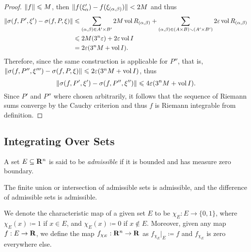 \begin{proof}
    \(\lVert f\rVert \leqslant M\), then \(\lVert f(\xi'_{\alpha}) - f(\xi_{(\alpha, \beta)})\rVert <
    2 M\) and thus
    \begin{align*}
        \lVert\sigma(f, P', \xi') - \sigma(f, P, \xi)\rVert
         & \leqslant  \sum_{(\alpha, \beta) \in A' \times B'} 2 M \operatorname{vol} R_{(\alpha, \beta)}
        + \sum_{(\alpha, \beta) \in (A \times B) \smallsetminus (A' \times B')}
        2 \varepsilon \operatorname{vol} R_{(\alpha, \beta)}                                        \\
         & \leqslant 2 M (3^n \varepsilon) + 2 \varepsilon \operatorname{vol} I                          \\
         & = 2 \varepsilon(3^n M + \operatorname{vol} I).
    \end{align*}
    Therefore, since the same construction is applicable for \(P''\), that is,
    \(\lVert\sigma(f, P'', \xi''') - \sigma(f, P, \xi)\rVert \leqslant 2 \varepsilon (3^n M +
    \operatorname{vol} I)\), thus
    \[
        \lVert\sigma(f, P', \xi') - \sigma(f, P'', \xi'')\rVert
        \leqslant 4 \varepsilon (3^n M + \operatorname{vol} I).
    \]
    Since \(P'\) and \(P''\) where chosen arbitrarily, it follows that the sequence
    of Riemann sums converge by the Cauchy criterion and thus \(f\) is Riemann
    integrable from definition.
\end{proof}

\subsection{Integrating Over Sets}

\begin{definition}
    \label{def:admissible-set}
    A set \(E \subseteq \mathbf{R}^n\) is said to be \emph{admissible} if it is bounded and
    has measure zero boundary.
\end{definition}

\begin{corollary}
    \label{cor:operations-admissible-sets}
    The finite union or intersection of admissible sets is admissible, and the
    difference of admissible sets is admissible.
\end{corollary}

\begin{notation}
    \label{not:characteristic-set}
    We denote the characteristic map of a given set \(E\) to be \(\chi_E: E \to \{0,
    1\}\), where \(\chi_E(x) \coloneq 1\) if \(x \in E\), and \(\chi_E(x) \coloneq
    0\) if \(x \not\in E\). Moreover, given any map \(f: E \to \mathbf{R}\), we define the
    map \(f_{\chi_E}: \mathbf{R}^n \to \mathbf{R}\) as \(f_{\chi_{E}}|_{E} \coloneq f\) and
    \(f_{\chi_{E}}\) is zero everywhere else.
\end{notation}

